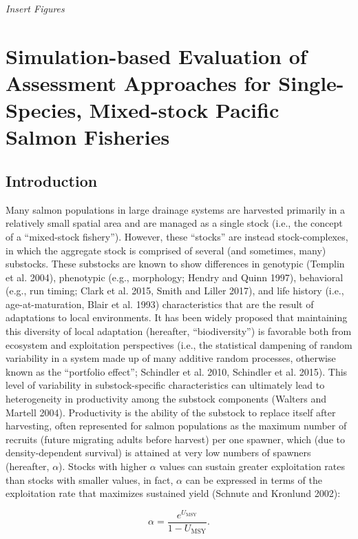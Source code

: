 \documentclass[12pt,]{book}
\theoremstyle{definition}
\theoremstyle{definition}
\theoremstyle{definition}
\theoremstyle{remark}
\begin{document}
\begin{singlespace}
\end{singlespace}

\emph{Insert Figures}

\chapter{Simulation-based Evaluation of Assessment Approaches for
Single-Species, Mixed-stock Pacific Salmon Fisheries}\label{ch4}

\section{Introduction}\label{introduction-2}

\noindent
Many salmon populations in large drainage systems are harvested
primarily in a relatively small spatial area and are managed as a single
stock (i.e., the concept of a ``mixed-stock fishery''). However, these
``stocks'' are instead stock-complexes, in which the aggregate stock is
comprised of several (and sometimes, many) substocks. These substocks
are known to show differences in genotypic (Templin et al. 2004),
phenotypic (e.g., morphology; Hendry and Quinn 1997), behavioral (e.g.,
run timing; Clark et al. 2015, Smith and Liller 2017), and life history
(i.e., age-at-maturation, Blair et al. 1993) characteristics that are
the result of adaptations to local environments. It has been widely
proposed that maintaining this diversity of local adaptation (hereafter,
``biodiversity'') is favorable both from ecosystem and exploitation
perspectives (i.e., the statistical dampening of random variability in a
system made up of many additive random processes, otherwise known as the
``portfolio effect''; Schindler et al. 2010, Schindler et al. 2015).
This level of variability in substock-specific characteristics can
ultimately lead to heterogeneity in productivity among the substock
components (Walters and Martell 2004). Productivity is the ability of
the substock to replace itself after harvesting, often represented for
salmon populations as the maximum number of recruits (future migrating
adults before harvest) per one spawner, which (due to density-dependent
survival) is attained at very low numbers of spawners (hereafter,
\(\alpha\)). Stocks with higher \(\alpha\) values can sustain greater
exploitation rates than stocks with smaller values, in fact, \(\alpha\)
can be expressed in terms of the exploitation rate that maximizes
sustained yield (Schnute and Kronlund 2002):

\begin{equation}
  \alpha=\frac{e^{U_{\text{MSY}}}}{1 - U_{\text{MSY}}}.
  \label{eq:umsy-to-alpha}
\end{equation}
\end{document}
